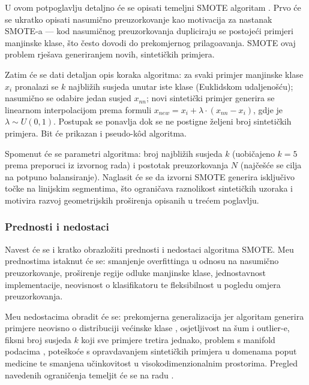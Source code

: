 U ovom potpoglavlju detaljno \'{c}e se opisati temeljni SMOTE algoritam
\cite{chawla2002}. Prvo \'{c}e se ukratko opisati nasumi\v{c}no
preuzorkovanje kao motivacija za nastanak SMOTE-a --- kod nasumi\v{c}nog
preuzorkovanja dupliciraju se postoje\'{c}i primjeri manjinske klase,
\v{s}to \v{c}esto dovodi do prekomjernog prilago\dj{}avanja. SMOTE ovaj
problem rje\v{s}ava generiranjem novih, sinteti\v{c}kih primjera.

Zatim \'{c}e se dati detaljan opis koraka algoritma: za svaki primjer
manjinske klase $x_i$ pronalazi se $k$ najbli\v{z}ih susjeda unutar iste
klase (Euklidskom udaljeno\v{s}\'{c}u); nasumi\v{c}no se odabire jedan
susjed $x_{nn}$; novi sinteti\v{c}ki primjer generira se linearnom
interpolacijom prema formuli $x_{new} = x_i + \lambda \cdot (x_{nn} - x_i)$,
gdje je $\lambda \sim U(0,1)$. Postupak se ponavlja dok se ne postigne
\v{z}eljeni broj sinteti\v{c}kih primjera. Bit \'{c}e prikazan i
pseudo-k\^{o}d algoritma.

Spomenut \'{c}e se parametri algoritma: broj najbli\v{z}ih susjeda $k$
(uobi\v{c}ajeno $k = 5$ prema preporuci iz izvornog rada) i postotak
preuzorkovanja $N$ (naj\v{c}e\v{s}\'{c}e se cilja na potpuno balansiranje).
Naglasit \'{c}e se da izvorni SMOTE generira isklju\v{c}ivo to\v{c}ke na
linijskim segmentima, \v{s}to ograni\v{c}ava raznolikost sinteti\v{c}kih
uzoraka i motivira razvoj geometrijskih pro\v{s}irenja opisanih u
tre\'{c}em poglavlju.

\subsubsection{Prednosti i nedostaci}

Navest \'{c}e se i kratko obrazlo\v{z}iti prednosti i nedostaci algoritma
SMOTE. Me\dj{}u prednostima istaknut \'{c}e se: smanjenje overfittinga u
odnosu na nasumi\v{c}no preuzorkovanje, pro\v{s}irenje regije odluke
manjinske klase, jednostavnost implementacije, neovisnost o klasifikatoru
te fleksibilnost u pogledu omjera preuzorkovanja.

Me\dj{}u nedostacima obradit \'{c}e se: prekomjerna generalizacija jer
algoritam generira primjere neovisno o distribuciji ve\'{c}inske klase
\cite{stefanowski2007}, osjetljivost na \v{s}um i outlier-e, fiksni broj
susjeda $k$ koji sve primjere tretira jednako, problem s manifold podacima
\cite{bellinger2016}, pote\v{s}ko\'{c}e s opravdavanjem sinteti\v{c}kih
primjera u domenama poput medicine te smanjena u\v{c}inkovitost u
visokodimenzionalnim prostorima. Pregled navedenih ograni\v{c}enja
temeljit \'{c}e se na radu \cite{fernandez2018}.
